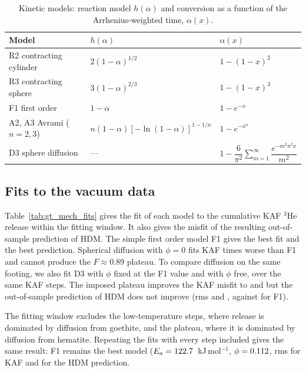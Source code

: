 \begin{table}[htbp]
  \centering
  \caption{Kinetic models: reaction model $h(\alpha)$ and conversion as a function of the Arrhenius-weighted time, $\alpha(x)$.}
  \label{tab:gt_mech_forms}
  \footnotesize
  \setlength{\tabcolsep}{4pt}
  \begin{tabular}{lll}
    \hline
    Model & $h(\alpha)$ & $\alpha(x)$ \\
    \hline
    R2 contracting cylinder & $2(1-\alpha)^{1/2}$ & $1-(1-x)^2$ \\
    R3 contracting sphere & $3(1-\alpha)^{2/3}$ & $1-(1-x)^3$ \\
    F1 first order & $1-\alpha$ & $1-e^{-x}$ \\
    A2, A3 Avrami ($n=2,3$) & $n(1-\alpha)[-\ln(1-\alpha)]^{1-1/n}$ & $1-e^{-x^n}$ \\
    D3 sphere diffusion & --- & $1-\dfrac{6}{\pi^2}\displaystyle\sum_{m=1}^{\infty} \dfrac{e^{-m^2\pi^2 x}}{m^2}$ \\
    \hline
  \end{tabular}
\end{table}

\subsection{Fits to the vacuum data} Table~\ref{tab:gt_mech_fits} gives the fit of each model to
the cumulative KAF $^3$He release within the fitting window. It also gives the misfit of the
resulting out-of-sample prediction of HDM. The simple first order model F1 gives the best
fit and the best prediction. Spherical diffusion with
$\phi=0$ fits KAF \ChTwoKinDThreeRmsRatio{} times worse than F1 and cannot produce the $F\approx0.89$
plateau. To compare diffusion on the same footing, we also fit D3 with $\phi$ fixed at the F1 value
and with $\phi$ free, over the same \ChTwoKinNKAF{} KAF steps. The imposed plateau improves the KAF
misfit to \ChTwoKinDThreePhiRmsKAF{} and \ChTwoKinDThreeFreeRmsKAF but the out-of-sample prediction of 
HDM does not improve (rms \ChTwoKinDThreePhiRmsHDM{} and
\ChTwoKinDThreeFreeRmsHDM, against \ChTwoKinFOneRmsHDM{} for F1). 

The fitting window excludes the low-temperature steps, where release is dominated by diffusion from
goethite, and the plateau, where it is dominated by diffusion from hematite. Repeating the fits with 
every step included gives the same result:
F1 remains the best model ($E_a = 122.7$~kJ\,mol$^{-1}$, $\phi = 0.112$, 
rms \ChTwoKinAllFOneRmsKAF{} for KAF and \ChTwoKinAllFOneRmsHDM{} for the HDM prediction.

